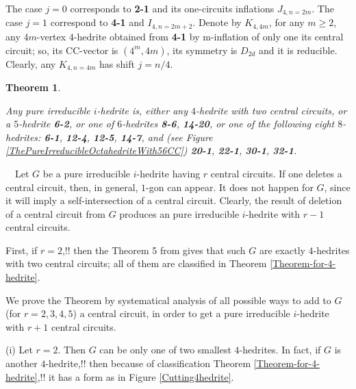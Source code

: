 \documentclass[12pt]{article}
\newtheorem{theorem}{Theorem}
\newcommand{\proof}{\noindent{\bf Proof.}\ \ }
\begin{document}
The case $j=0$ corresponds to {\bf 2-1} and its one-circuits inflations
$J_{4,n=2m}$. The case $j=1$ correspond to {\bf 4-1} and $I_{4,n=2m+2}$.
Denote by $K_{4,4m}$, for any $m \ge 2$, any $4m$-vertex $4$-hedrite obtained
from {\bf 4-1} by m-inflation of only one its central circuit; so, its 
CC-vector is $(4^m,4m)$, its symmetry is $D_{2d}$ and it is reducible.
Clearly, any $K_{4,n=4m}$ has shift $j=n/4$.




%










\begin{theorem}\label{TheOneWithSimpleCentralCircuit}

Any pure irreducible $i$-hedrite is, either any $4$-hedrite with two
central circuits, or a $5$-hedrite {\bf 6-2}, or one of $6$-hedrites
{\bf 8-6}, {\bf 14-20}, or one of the following eight $8$-hedrites:
{\bf 6-1}, {\bf 12-4}, {\bf 12-5}, {\bf 14-7}, and (see Figure 
\ref{ThePureIrreducibleOctahedriteWith56CC}) {\bf 20-1}, {\bf 22-1},
{\bf 30-1}, {\bf 32-1}.


\end{theorem}


\proof Let $G$ be a pure irreducible $i$-hedrite having $r$ central circuits. 
If one deletes a central circuit, then, in general, $1$-gon can appear. It 
does not happen for $G$, since it will imply a self-intersection of a central 
circuit. Clearly, the result of deletion of a central circuit from $G$ 
produces an pure irreducible $i$-hedrite with $r-1$ central circuits.

First, if $r=2$,!! then the Theorem 5 from \cite{DSt} gives that such $G$ are 
exactly $4$-hedrites with two central circuits; all of them are classified 
in Theorem \ref{Theorem-for-4-hedrite}.

We prove the Theorem by systematical analysis of all possible ways to add 
to $G$ (for $r=2,3,4,5$) a central circuit, in order to get a pure 
irreducible $i$-hedrite with $r+1$ central circuits. 


(i) Let $r=2$. Then $G$ can be only one of two smallest $4$-hedrites. In 
fact, if $G$ is another $4$-hedrite,!! then because of classification Theorem 
\ref{Theorem-for-4-hedrite},!! it has a form as in Figure \ref{Cutting4hedrite}.
\end{document}
